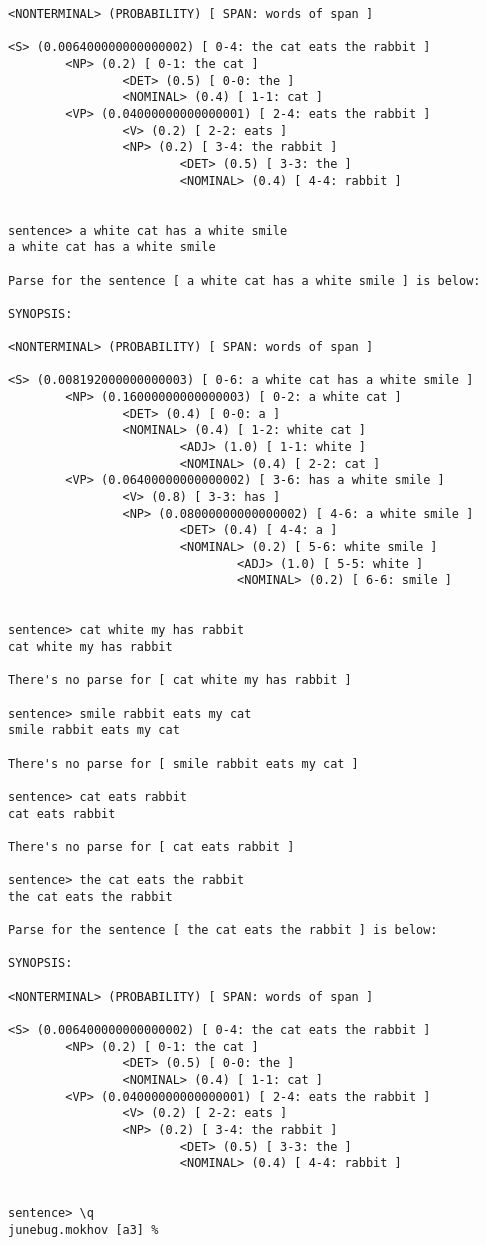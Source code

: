 \begin{verbatim}
<NONTERMINAL> (PROBABILITY) [ SPAN: words of span ]

<S> (0.006400000000000002) [ 0-4: the cat eats the rabbit ]
        <NP> (0.2) [ 0-1: the cat ]
                <DET> (0.5) [ 0-0: the ]
                <NOMINAL> (0.4) [ 1-1: cat ]
        <VP> (0.04000000000000001) [ 2-4: eats the rabbit ]
                <V> (0.2) [ 2-2: eats ]
                <NP> (0.2) [ 3-4: the rabbit ]
                        <DET> (0.5) [ 3-3: the ]
                        <NOMINAL> (0.4) [ 4-4: rabbit ]


sentence> a white cat has a white smile
a white cat has a white smile

Parse for the sentence [ a white cat has a white smile ] is below:

SYNOPSIS:

<NONTERMINAL> (PROBABILITY) [ SPAN: words of span ]

<S> (0.008192000000000003) [ 0-6: a white cat has a white smile ]
        <NP> (0.16000000000000003) [ 0-2: a white cat ]
                <DET> (0.4) [ 0-0: a ]
                <NOMINAL> (0.4) [ 1-2: white cat ]
                        <ADJ> (1.0) [ 1-1: white ]
                        <NOMINAL> (0.4) [ 2-2: cat ]
        <VP> (0.06400000000000002) [ 3-6: has a white smile ]
                <V> (0.8) [ 3-3: has ]
                <NP> (0.08000000000000002) [ 4-6: a white smile ]
                        <DET> (0.4) [ 4-4: a ]
                        <NOMINAL> (0.2) [ 5-6: white smile ]
                                <ADJ> (1.0) [ 5-5: white ]
                                <NOMINAL> (0.2) [ 6-6: smile ]


sentence> cat white my has rabbit
cat white my has rabbit

There's no parse for [ cat white my has rabbit ]

sentence> smile rabbit eats my cat
smile rabbit eats my cat

There's no parse for [ smile rabbit eats my cat ]

sentence> cat eats rabbit
cat eats rabbit

There's no parse for [ cat eats rabbit ]

sentence> the cat eats the rabbit
the cat eats the rabbit

Parse for the sentence [ the cat eats the rabbit ] is below:

SYNOPSIS:

<NONTERMINAL> (PROBABILITY) [ SPAN: words of span ]

<S> (0.006400000000000002) [ 0-4: the cat eats the rabbit ]
        <NP> (0.2) [ 0-1: the cat ]
                <DET> (0.5) [ 0-0: the ]
                <NOMINAL> (0.4) [ 1-1: cat ]
        <VP> (0.04000000000000001) [ 2-4: eats the rabbit ]
                <V> (0.2) [ 2-2: eats ]
                <NP> (0.2) [ 3-4: the rabbit ]
                        <DET> (0.5) [ 3-3: the ]
                        <NOMINAL> (0.4) [ 4-4: rabbit ]


sentence> \q
junebug.mokhov [a3] %
\end{verbatim}
